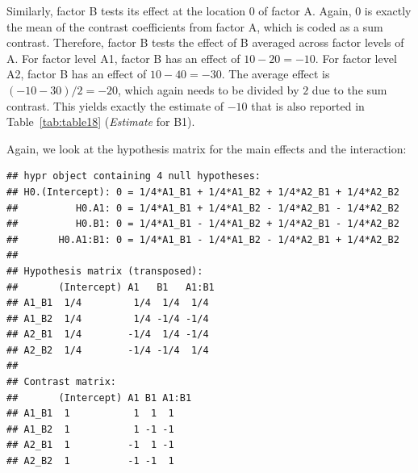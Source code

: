 \documentclass[12pt,]{krantz}
\newenvironment{Shaded}{\begin{snugshade}}{\end{snugshade}}
\newcommand{\KeywordTok}[1]{\textcolor[rgb]{0.13,0.29,0.53}{\textbf{#1}}}
\newcommand{\DecValTok}[1]{\textcolor[rgb]{0.00,0.00,0.81}{#1}}
\newcommand{\StringTok}[1]{\textcolor[rgb]{0.31,0.60,0.02}{#1}}
\newcommand{\CommentTok}[1]{\textcolor[rgb]{0.56,0.35,0.01}{\textit{#1}}}
\newcommand{\OperatorTok}[1]{\textcolor[rgb]{0.81,0.36,0.00}{\textbf{#1}}}
\newcommand{\NormalTok}[1]{#1}
\theoremstyle{definition}
\theoremstyle{definition}
\theoremstyle{definition}
\theoremstyle{remark}
\begin{document}
Similarly, factor B tests its effect at the location \(0\) of factor A.
Again, \(0\) is exactly the mean of the contrast coefficients from
factor A, which is coded as a sum contrast. Therefore, factor B tests
the effect of B averaged across factor levels of A. For factor level A1,
factor B has an effect of \(10 - 20 = -10\). For factor level A2, factor
B has an effect of \(10 - 40 = -30\). The average effect is
\((-10 - 30)/2 = -20\), which again needs to be divided by \(2\) due to
the sum contrast. This yields exactly the estimate of \(-10\) that is
also reported in Table~\ref{tab:table18} (\emph{Estimate} for B1).

Again, we look at the hypothesis matrix for the main effects and the
interaction:

\begin{Shaded}
\end{Shaded}

\begin{verbatim}
## hypr object containing 4 null hypotheses:
## H0.(Intercept): 0 = 1/4*A1_B1 + 1/4*A1_B2 + 1/4*A2_B1 + 1/4*A2_B2
##          H0.A1: 0 = 1/4*A1_B1 + 1/4*A1_B2 - 1/4*A2_B1 - 1/4*A2_B2
##          H0.B1: 0 = 1/4*A1_B1 - 1/4*A1_B2 + 1/4*A2_B1 - 1/4*A2_B2
##       H0.A1:B1: 0 = 1/4*A1_B1 - 1/4*A1_B2 - 1/4*A2_B1 + 1/4*A2_B2
## 
## Hypothesis matrix (transposed):
##       (Intercept) A1   B1   A1:B1
## A1_B1  1/4         1/4  1/4  1/4 
## A1_B2  1/4         1/4 -1/4 -1/4 
## A2_B1  1/4        -1/4  1/4 -1/4 
## A2_B2  1/4        -1/4 -1/4  1/4 
## 
## Contrast matrix:
##       (Intercept) A1 B1 A1:B1
## A1_B1  1           1  1  1   
## A1_B2  1           1 -1 -1   
## A2_B1  1          -1  1 -1   
## A2_B2  1          -1 -1  1
\end{verbatim}
\end{document}
